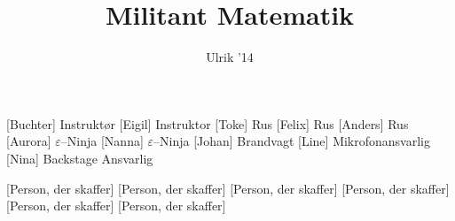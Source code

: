 \documentclass[a4paper,11pt]{article}
\title{Militant Matematik}
\author{Ulrik '14}
\begin{document}
\maketitle

\begin{roles}
[Buchter] Instruktør
[Eigil] Instruktor
[Toke] Rus 
[Felix] Rus 
[Anders] Rus 
[Aurora] $\varepsilon$--Ninja
[Nanna] $\varepsilon$--Ninja
[Johan] Brandvagt
[Line] Mikrofonansvarlig
[Nina] Backstage Ansvarlig
\end{roles}

\begin{props}
[Person, der skaffer]
[Person, der skaffer]
[Person, der skaffer]
[Person, der skaffer]
[Person, der skaffer]
[Person, der skaffer]
\end{props}
\end{document}
